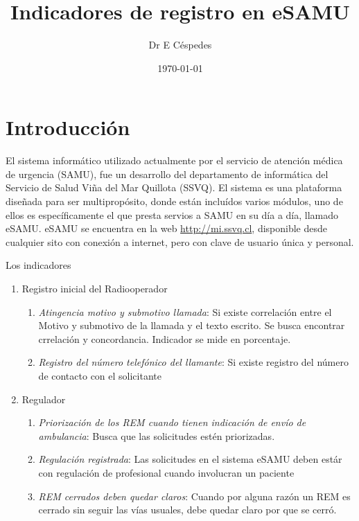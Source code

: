 \documentclass{article}
\title{Indicadores de registro en eSAMU}
\author[1]{Dr E Céspedes}
\affil[1]{Tecnologías SAMU Viña del Mar}
\date{\today}
\begin{document}
\maketitle


\tableofcontents

\section{Introducción}
El sistema informático utilizado actualmente por el servicio de atención médica de urgencia (SAMU), fue un desarrollo del departamento de informática del Servicio de Salud Viña del Mar Quillota (SSVQ). El sistema es una plataforma diseñada para ser multipropósito, donde están incluídos varios módulos, uno de ellos es específicamente el que presta servios a SAMU en su día a día, llamado eSAMU. eSAMU se encuentra en la web  \url{http://mi.ssvq.cl}, disponible desde cualquier sito con conexión a internet, pero con clave de usuario única y personal.



Los indicadores
\begin{enumerate}

\item Registro inicial del Radiooperador
	\begin{enumerate}
	\item \emph{Atingencia motivo y submotivo llamada}: Si existe correlación entre el Motivo y submotivo de la llamada y el texto escrito. Se busca encontrar crrelación y concordancia. Indicador se mide en porcentaje.
	
	\item \emph{Registro del número telefónico del llamante}: Si existe registro del número de contacto con el solicitante
	\end{enumerate}

\item Regulador
	\begin{enumerate}
	\item	\emph{Priorización de los REM cuando tienen indicación de envío de ambulancia}: Busca que las solicitudes estén priorizadas.

	\item 	\emph{Regulación registrada}: Las solicitudes en el sistema eSAMU deben estár con regulación de profesional cuando involucran un paciente

	\item 	\emph{REM cerrados deben quedar claros}: Cuando por alguna razón un REM es cerrado sin seguir las vías usuales, debe quedar claro por que se cerró.
	\end{enumerate}





\end{enumerate}
\end{document}

